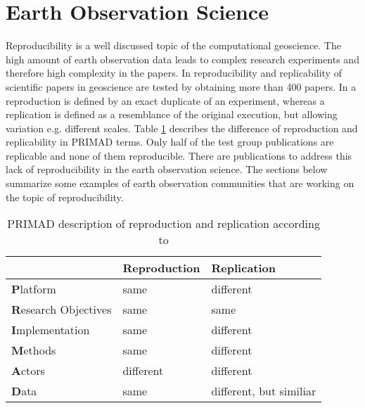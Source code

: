 \documentclass[draft,final]{vutinfth} %
\begin{document}
\section{Earth Observation Science}\label{EOScience}

Reproducibility is a well discussed topic of the computational geoscience. The high amount of earth observation data leads to complex research experiments and therefore high complexity in the papers.  In \cite{Ostermann2017AdvancingSW} reproducibility and replicability of scientific papers in geoscience are tested by obtaining more than 400 papers. In \cite{Ostermann2017AdvancingSW} a reproduction is defined by an exact duplicate of an experiment, whereas a replication is defined as a resemblance of the original execution, but allowing variation e.g. different scales. Table \ref{Tab:geoprimad} describes the difference of reproduction and replicability in PRIMAD terms. Only half of the test group publications are replicable and none of them reproducible. There are publications to address this lack of reproducibility in the earth observation science. The sections below summarize some examples of earth observation communities that are working on the topic of reproducibility.   

\begin{table}[]
	\caption{PRIMAD description of reproduction and replication according to \cite{Ostermann2017AdvancingSW}}
	\begin{tabular}{l|l|l}
		 & \textbf{Reproduction} & \textbf{Replication}  \\ \hline
		\textbf{P}latform & same & different \\ \hline 
		\textbf{R}esearch Objectives & same & same \\ \hline  
		\textbf{I}mplementation  & same & different  \\ \hline  
		\textbf{M}ethods & same & different \\ \hline 
		\textbf{A}ctors & different & different \\ \hline
		\textbf{D}ata & same & different, but similiar \\ \hline
	\end{tabular}
	\label{Tab:geoprimad}
\end{table}
\end{document}

